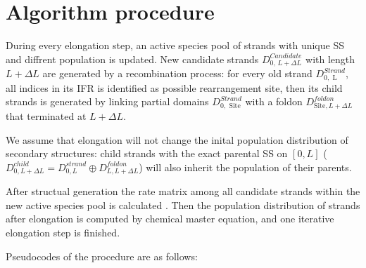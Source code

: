 \documentclass[11pt, a4paper]{article}
\begin{document}
\section{Algorithm procedure}

During every elongation step, an active species pool of strands with unique SS and diffrent population is updated. New candidate strands $D^{Candidate}_{0,\, L+\Delta L}$ with
length $L+\Delta L$ are generated by a recombination
process: for every old strand $D^{Strand}_{0, \text{ L}}$, all indices in its IFR is identified as possible rearrangement site, then its child strands is generated by linking partial domains
$D^{Strand}_{0, \text{ Site}}$ with a foldon $D^{foldon}_{\text{Site}, L+\Delta L}$ that terminated at $L+\Delta L$.

We assume that elongation will not change the inital population distribution
of secondary structures: child strands with the exact parental SS on $[0, L]$ ($D^{child}_{0, L+\Delta L} = D^{strand}_{0, L} \oplus D^{foldon}_{L, L+\Delta L}$) will also inherit the population of their parents.

After structual generation the rate matrix among all candidate strands within the new active species pool is calculated%
. Then the population
distribution of strands after elongation is computed by chemical master equation, and one iterative elongation step is finished.

Pseudocodes of the procedure are as follows:
\end{document}
